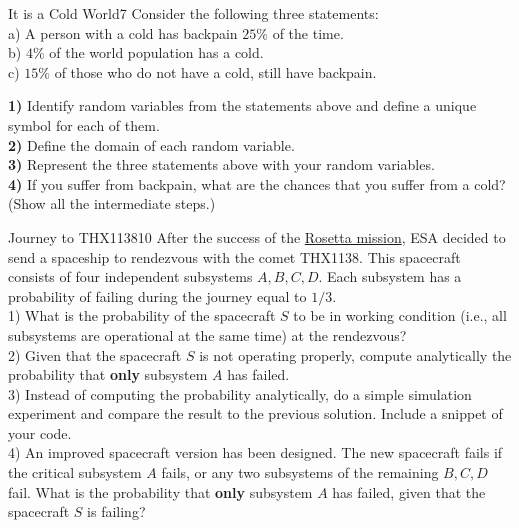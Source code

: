 \begin{questions}
\begin{question}{It is a Cold World}{7}
Consider the following three statements:
\\
a) A person with a cold has backpain $25\%$ of the time.
\\
b) $4\%$ of the world population has a cold.
\\
c) $15\%$ of those who do not have a cold, still have backpain.

\textbf{1)} Identify random variables from the statements above and define a unique symbol for each of them.\\
\textbf{2)} Define the domain of each random variable.\\
\textbf{3)} Represent the three statements above with your random variables.\\
\textbf{4)} If you suffer from backpain, what are the chances that you suffer from a cold? (Show all the intermediate steps.)

\begin{answer}\end{answer}

\end{question}



\begin{question}{Journey to THX1138}{10}
	After the success of the \href{http://rosetta.esa.int/}{Rosetta mission}, ESA decided to send a spaceship to rendezvous with the comet THX1138. 
	This spacecraft consists of four independent subsystems $A,B,C,D$. 
	Each subsystem has a probability of failing during the journey equal to $1/3$. 
	\\
	1) What is the probability of the spacecraft $S$ to be in working condition (i.e., all subsystems are operational at the same time) at the rendezvous?
	\\
	2) Given that the spacecraft $S$ is not operating properly, compute	analytically the probability that \textbf{only} subsystem $A$ has failed. 
	\\
	3) Instead of computing the probability analytically, do a simple simulation experiment and compare the result to the previous solution. 
	Include a snippet of your code. 
	\\
	4) An improved spacecraft version has been designed.
	The new spacecraft fails if the critical subsystem $A$ fails, or any two subsystems of the remaining $B,C,D$ fail. 
	What is the probability that \textbf{only} subsystem $A$ has failed, given that the spacecraft $S$ is failing? 
	
	
\begin{answer}\end{answer}
	
\end{question}


\end{questions}
